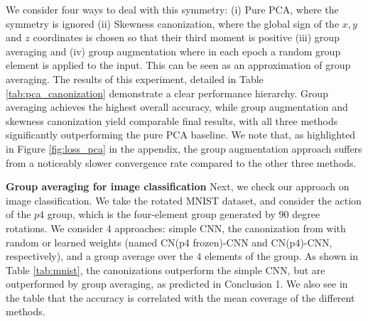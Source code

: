 \documentclass{article}
\begin{document}
We consider four ways to deal with this symmetry: (i) Pure PCA, where the symmetry is ignored (ii) Skewness canonization, where the global sign of the $x,y$ and $z$ coordinates is chosen so that their third moment is positive (iii) group averaging and (iv) group augmentation where in each epoch a random group element is applied to the input. This  can be seen as an approximation of group averaging. The results of this experiment, detailed in Table \ref{tab:pca_canonization}  demonstrate a clear performance hierarchy. Group averaging achieves the highest overall accuracy, while group augmentation and skewness canonization yield comparable final results, with all three methods significantly outperforming the pure PCA baseline. We note that, as highlighted in Figure \ref{fig:loss_pca} in the appendix, the group augmentation approach suffers from a noticeably slower convergence rate compared to the other three methods.

\textbf{Group averaging for image classification} Next, we check our approach on image classification. We take the rotated MNIST \cite{larochelle2007empirical} dataset, and consider the action of the $p4$ group, which is the four-element group generated by $90$ degree rotations. We consider 4 approaches: simple CNN, the canonization from \cite{kaba2023equivariance} with random or learned weights (named CN(p4 frozen)-CNN and CN(p4)-CNN, respectively), and a group average over the $4$ elements of the group. As shown in Table \ref{tab:mnist}, the canonizations outperform the simple CNN, but are outperformed by group averaging, as predicted in Conclusion 1. We also see in the table that the accuracy is correlated with the mean coverage of the different methods.
\end{document}
